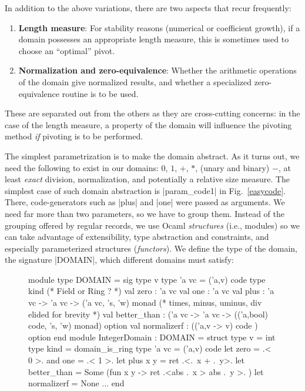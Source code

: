 \documentclass{llncs}
\begin{document}
\noindent In addition to the above variations, there are two aspects that 
recur frequently:
\vspace*{-6pt}
\begin{enumerate}
    \item \textbf{Length measure}:  For stability reasons
        (numerical or coefficient growth), if a domain
      possesses
        an appropriate length measure, this is sometimes used to choose
        an ``optimal'' pivot.
    \item \textbf{Normalization and zero-equivalence}: Whether the
      arithmetic operations of the domain give normalized results, and
      whether a specialized zero-equivalence routine is to be used.
\end{enumerate}
\noindent These are separated out from the others as they are cross-cutting
concerns: in the case of the length measure, a property of the domain
will influence the pivoting method \emph{if} pivoting is to be
performed.

The simplest parametrization is to make the domain abstract. As it
turns out, we need the following to exist in our domains: $0$, $1$,
$+$, $*$, (unary and binary) $-$, at least \emph{exact} division,
normalization, and potentially a relative size measure. The simplest
case of such domain abstraction is |param_code1| in
Fig.~\ref{easycode}. There, code-generators such as |plus| and |one|
were passed as arguments. We need far more than
two parameters, so we have to group them. Instead of the grouping
offered by regular records, we use Ocaml \emph{structures} (i.e.,
modules)
so we can take advantage of extensibility, type abstraction and constraints,
and especially parameterized structures (\emph{functors}).
We define the type of the domain, the signature |DOMAIN|, which
different domains must satisfy:
\begin{figure}[h]
\begin{code}
module type DOMAIN = sig
  type v    type 'a vc = ('a,v) code
  type kind (* Field or Ring ? *)
  val zero : 'a vc   val one : 'a vc
  val plus : 'a vc -> 'a vc -> ('a vc, 's, 'w) monad
  (* times, minus, uminus, div elided for brevity *)
  val better_than : ('a vc -> 'a vc -> 
      (('a,bool) code, 's, 'w) monad) option
  val normalizerf : (('a,v -> v) code ) option
end 
module IntegerDomain : DOMAIN = struct
  type v = int  type kind = domain_is_ring
  type 'a vc = ('a,v) code
  let zero = .< 0 >.  and one = .< 1 >. 
  let plus x y = ret .<.~x + .~y>. 
  let better_than = Some (fun x y -> ret .<abs .~x > abs .~y >. )
  let normalizerf = None
  ...
end
\end{code}
\end{figure}
\end{document}
